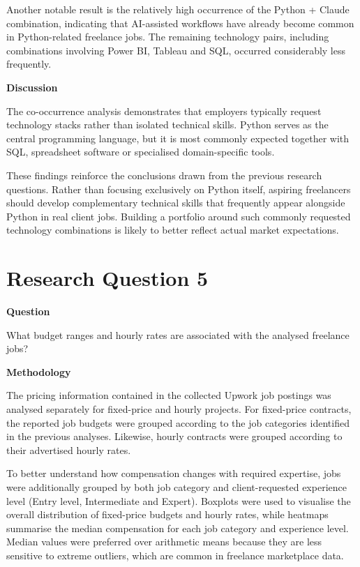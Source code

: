 Another notable result is the relatively high occurrence of the Python + Claude combination, indicating that AI-assisted workflows have already
become common in Python-related freelance jobs. The remaining technology pairs, including combinations involving Power BI, Tableau and SQL,
occurred considerably less frequently.

\textbf{Discussion}

The co-occurrence analysis demonstrates that employers typically request technology stacks rather than isolated technical skills. Python serves as
the central programming language, but it is most commonly expected together with SQL, spreadsheet software or specialised domain-specific tools.

These findings reinforce the conclusions drawn from the previous research questions. Rather than focusing exclusively on Python itself, aspiring
freelancers should develop complementary technical skills that frequently appear alongside Python in real client jobs. Building a portfolio around
such commonly requested technology combinations is likely to better reflect actual market expectations.

\section{Research Question 5}

\textbf{Question}

What budget ranges and hourly rates are associated with the analysed freelance jobs?

\medskip

\textbf{Methodology}

The pricing information contained in the collected Upwork job postings was analysed separately for fixed-price and hourly projects. For fixed-price
contracts, the reported job budgets were grouped according to the job categories identified in the previous analyses. Likewise, hourly contracts
were grouped according to their advertised hourly rates.

To better understand how compensation changes with required expertise, jobs were additionally grouped by both job category and client-requested
experience level (Entry level, Intermediate and Expert). Boxplots were used to visualise the overall distribution of fixed-price budgets and
hourly rates, while heatmaps summarise the median compensation for each job category and experience level. Median values were preferred over
arithmetic means because they are less sensitive to extreme outliers, which are common in freelance marketplace data.

